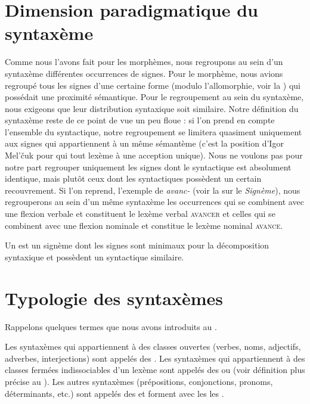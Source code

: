 \section{Dimension paradigmatique du syntaxème}\label{sec:3.1.9}

Comme nous l’avons fait pour les morphèmes, nous regroupons au sein d’un syntaxème différentes occurrences de signes. Pour le morphème, nous avions regroupé tous les signes d’une certaine forme (modulo l’allomorphie, voir la ) qui possédait une proximité sémantique. Pour le regroupement au sein du syntaxème, nous exigeons que leur distribution syntaxique soit similaire. Notre définition du syntaxème reste de ce point de vue un peu floue : si l’on prend en compte l’ensemble du syntactique, notre regroupement se limitera quasiment uniquement aux signes qui appartiennent à un même sémantème (c’est la position d’Igor Mel’čuk pour qui tout lexème à une acception unique). Nous ne voulons pas pour notre part regrouper uniquement les signes dont le syntactique est absolument identique, mais plutôt ceux dont les syntactiques possèdent un certain recouvrement. Si l’on reprend, l’exemple de \textit{avanc-} (voir la  sur le \textit{Signème}), nous regrouperons au sein d’un même syntaxème les occurrences qui se combinent avec une flexion verbale et constituent le lexème verbal \textsc{avancer} et celles qui se combinent avec une flexion nominale et constitue le lexème nominal \textsc{avance}.

\begin{styleLivreImportant}
Un  est un signème dont les signes sont minimaux pour la décomposition syntaxique et possèdent un syntactique similaire.
\end{styleLivreImportant}

\section{Typologie des syntaxèmes}\label{sec:3.1.10}

Rappelons quelques termes que nous avons introduits au .

Les syntaxèmes qui appartiennent à des classes ouvertes (verbes, noms, adjectifs, adverbes, interjections) sont appelés des . Les syntaxèmes qui appartiennent à des classes fermées indissociables d’un lexème sont appelés des  ou  (voir définition plus précise au ). Les autres syntaxèmes (prépositions, conjonctions, pronoms, déterminants, etc.) sont appelés des  et forment avec les  les .

